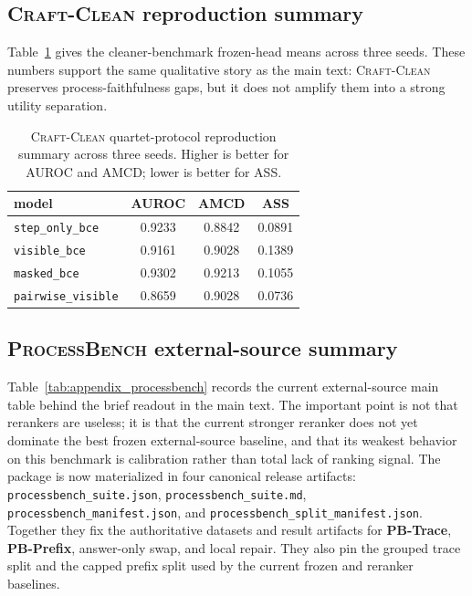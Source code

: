 \subsection{\textsc{Craft-Clean} reproduction summary}

Table~\ref{tab:appendix_benchv3_repro} gives the cleaner-benchmark frozen-head
means across three seeds. These numbers support the same qualitative story as
the main text: \textsc{Craft-Clean} preserves process-faithfulness gaps, but it does
not amplify them into a strong utility separation.

\begin{table}[h]
\centering
\caption{\textsc{Craft-Clean} quartet-protocol reproduction summary across
three seeds. Higher is better for AUROC and AMCD; lower is better for ASS.}
\label{tab:appendix_benchv3_repro}
\small
\begin{tabular}{lccc}
\toprule
model & AUROC & AMCD & ASS \\
\midrule
\texttt{step\_only\_bce} & 0.9233 & 0.8842 & 0.0891 \\
\texttt{visible\_bce} & 0.9161 & 0.9028 & 0.1389 \\
\texttt{masked\_bce} & 0.9302 & 0.9213 & 0.1055 \\
\texttt{pairwise\_visible} & 0.8659 & 0.9028 & 0.0736 \\
\bottomrule
\end{tabular}
\end{table}

\subsection{\textsc{ProcessBench} external-source summary}

Table~\ref{tab:appendix_processbench} records the current external-source main
table behind the brief readout in the main text. The important point is not
that rerankers are useless; it is that the current stronger reranker does not
yet dominate the best frozen external-source baseline, and that its weakest
behavior on this benchmark is calibration rather than total lack of ranking
signal.
The package is now materialized in four canonical release artifacts:
\texttt{processbench\_suite.json}, \texttt{processbench\_suite.md},
\texttt{processbench\_manifest.json}, and
\texttt{processbench\_split\_manifest.json}. Together they fix the
authoritative datasets and result artifacts for \textbf{PB-Trace},
\textbf{PB-Prefix}, answer-only swap, and local repair. They also pin the
grouped trace split and the capped prefix split used by the current frozen and
reranker baselines.

